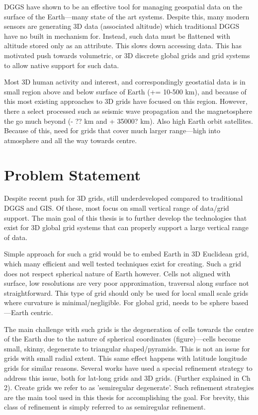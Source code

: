 DGGS have shown to be an effective tool for managing geospatial data on the surface of the Earth---many state of the art systems. Despite this, many modern sensors are generating 3D data (associated altitude) which traditional DGGS have no built in mechanism for. Instead, such data must be flattened with altitude stored only as an attribute. This slows down accessing data. This has motivated push towards volumetric, or 3D discrete global grids and grid systems to allow native support for such data.

Most 3D human activity and interest, and correspondingly geostatial data is in small region above and below surface of Earth (+= 10-500 km), and because of this most existing approaches to 3D grids have focused on this region. However, there a select processed such as seismic wave propagation and the magnetosphere the go much beyond (- ?? km and + 35000? km). Also high Earth orbit satellites. Because of this, need for grids that cover much larger range---high into atmosphere and all the way towards centre. 


\section{Problem Statement}

Despite recent push for 3D grids, still underdeveloped compared to traditional DGGS and GIS. Of these, most focus on small vertical range of data/grid support. The main goal of this thesis is to further develop the technologies that exist for 3D global grid systems that can properly support a large vertical range of data.

Simple approach for such a grid would be to embed Earth in 3D Euclidean grid, which many efficient and well tested techniques exist for creating. Such a grid does not respect spherical nature of Earth however. Cells not aligned with surface, low resolutions are very poor approximation, traversal along surface not straightforward. This type of grid should only be used for local small scale grids where curvature is minimal/negligible. For global grid, needs to be sphere based---Earth centric. 

The main challenge with such grids is the degeneration of cells towards the centre of the Earth due to the nature of spherical coordinates (figure)---cells become small, skinny, degenerate to triangular shaped/pyramids. This is not an issue for grids with small radial extent. This same effect happens with latitude longitude grids for similar reasons. Several works have used a special refinement strategy to address this issue, both for lat-long grids and 3D grids. (Further explained in Ch 2). Create grids we refer to as 'semiregular degenerate'. Such refinement strategies are the main tool used in this thesis for accomplishing the goal. For brevity, this class of refinement is simply referred to as semiregular refinement.  

